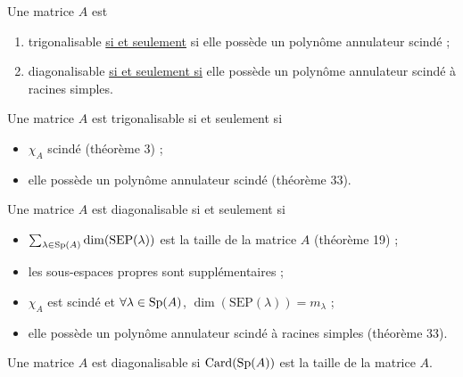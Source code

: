 \begin{thm}
	Une matrice $A$\/ est
	\begin{enumerate}
		\item trigonalisable \underline{si et seulement} si elle possède un polynôme annulateur scindé ;
		\item diagonalisable \underline{si et seulement si} elle possède un polynôme annulateur scindé à racines simples.
	\end{enumerate}
\end{thm}

\begin{rap}
	Une matrice $A$\/ est trigonalisable si et seulement si
	\begin{itemize}
		\item $\chi_A$\/ scindé (théorème 3) ;
		\item elle possède un polynôme annulateur scindé (théorème 33).
	\end{itemize}

	Une matrice $A$\/ est diagonalisable si et seulement si
	\begin{itemize}
		\item $\sum_{\lambda \in \operatorname{Sp}(A)} \dim(\mathrm{SEP}(\lambda))$\/ est la taille de la matrice $A$\/ (théorème 19) ;
		\item les sous-espaces propres sont supplémentaires ;
		\item $\chi_A$\/ est scindé et $\forall \lambda \in \operatorname{Sp}(A)$, $\dim(\mathrm{SEP}(\lambda)) = m_\lambda$\/ ;
		\item elle possède un polynôme annulateur scindé à racines simples (théorème 33).
	\end{itemize}

	Une matrice $A$\/ est diagonalisable si $\operatorname{Card}(\operatorname{Sp}(A))$\/ est la taille de la matrice $A$.
\end{rap}

